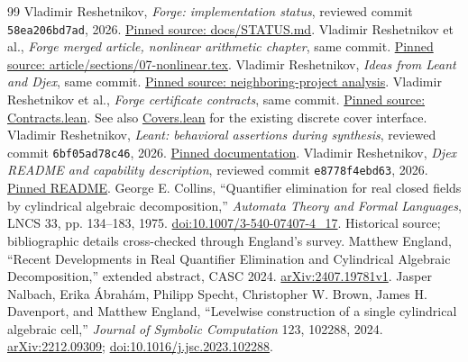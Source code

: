 \begin{thebibliography}{99}
\small
{} Vladimir Reshetnikov, \emph{Forge: implementation status}, reviewed commit \texttt{58ea206bd7ad}, 2026. \href{https://github.com/VladimirReshetnikov/Forge/blob/58ea206bd7ad501b930add568151217bcc7f82a2/docs/STATUS.md}{Pinned source: docs/STATUS.md}.
 Vladimir Reshetnikov et al., \emph{Forge merged article, nonlinear arithmetic chapter}, same commit. \href{https://github.com/VladimirReshetnikov/Forge/blob/58ea206bd7ad501b930add568151217bcc7f82a2/article/sections/07-nonlinear.tex}{Pinned source: article/sections/07-nonlinear.tex}.
 Vladimir Reshetnikov, \emph{Ideas from Leant and Djex}, same commit. \href{https://github.com/VladimirReshetnikov/Forge/blob/58ea206bd7ad501b930add568151217bcc7f82a2/docs/IDEAS-FROM-LEANT-DJEX.md}{Pinned source: neighboring-project analysis}.
 Vladimir Reshetnikov et al., \emph{Forge certificate contracts}, same commit. \href{https://github.com/VladimirReshetnikov/Forge/blob/58ea206bd7ad501b930add568151217bcc7f82a2/lean/Forge/Design/Contracts.lean}{Pinned source: Contracts.lean}. See also \href{https://github.com/VladimirReshetnikov/Forge/blob/58ea206bd7ad501b930add568151217bcc7f82a2/lean/Forge/Closure/Covers.lean}{Covers.lean} for the existing discrete cover interface.
 Vladimir Reshetnikov, \emph{Leant: behavioral assertions during synthesis}, reviewed commit \texttt{6bf05ad78c46}, 2026. \href{https://github.com/VladimirReshetnikov/Leant/blob/6bf05ad78c467989e68290f2d08bbed40802d485/docs/behavioral-synthesis.md}{Pinned documentation}.
 Vladimir Reshetnikov, \emph{Djex README and capability description}, reviewed commit \texttt{e8778f4ebd63}, 2026. \href{https://github.com/VladimirReshetnikov/Djex/blob/e8778f4ebd63e1f9b9b410fa4de8d14a8a04c9e5/README.md}{Pinned README}.
 George E. Collins, ``Quantifier elimination for real closed fields by cylindrical algebraic decomposition,'' \emph{Automata Theory and Formal Languages}, LNCS 33, pp. 134--183, 1975. \href{https://doi.org/10.1007/3-540-07407-4_17}{doi:10.1007/3-540-07407-4\_17}. Historical source; bibliographic details cross-checked through England's survey.
 Matthew England, ``Recent Developments in Real Quantifier Elimination and Cylindrical Algebraic Decomposition,'' extended abstract, CASC 2024. \href{https://arxiv.org/html/2407.19781v1}{arXiv:2407.19781v1}.
 Jasper Nalbach, Erika \'Abrah\'am, Philipp Specht, Christopher W. Brown, James H. Davenport, and Matthew England, ``Levelwise construction of a single cylindrical algebraic cell,'' \emph{Journal of Symbolic Computation} 123, 102288, 2024. \href{https://arxiv.org/abs/2212.09309}{arXiv:2212.09309}; \href{https://doi.org/10.1016/j.jsc.2023.102288}{doi:10.1016/j.jsc.2023.102288}.

\end{thebibliography}
